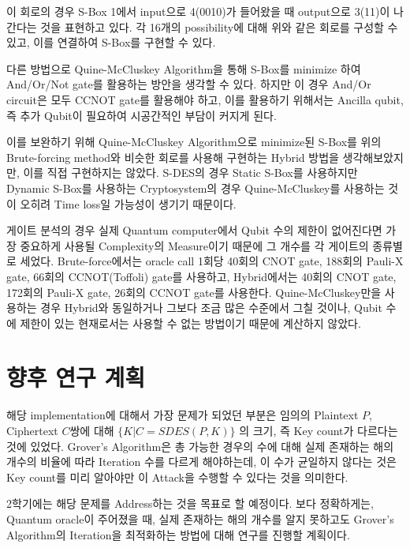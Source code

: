 \documentclass{article}
\theoremstyle{break}
\begin{document}
	이 회로의 경우 S-Box 1에서 input으로 4(0010)가 들어왔을 때 output으로 3(11)이 나간다는 것을 표현하고 있다. 각 16개의 possibility에 대해 위와 같은 회로를 구성할 수 있고, 이를 연결하여 S-Box를 구현할 수 있다.
	
	다른 방법으로 Quine-McCluskey Algorithm을 통해 S-Box를 minimize 하여 And/Or/Not gate를 활용하는 방안을 생각할 수 있다. 하지만 이 경우 And/Or circuit은 모두 CCNOT gate를 활용해야 하고, 이를 활용하기 위해서는 Ancilla qubit, 즉 추가 Qubit이 필요하여 시공간적인 부담이 커지게 된다.
	
	이를 보완하기 위해 Quine-McCluskey Algorithm으로 minimize된 S-Box를 위의 Brute-forcing method와 비슷한 회로를 사용해 구현하는 Hybrid 방법을 생각해보았지만, 이를 직접 구현하지는 않았다. S-DES의 경우 Static S-Box를 사용하지만 Dynamic S-Box를 사용하는 Cryptosystem의 경우 Quine-McCluskey를 사용하는 것이 오히려 Time loss일 가능성이 생기기 때문이다.
	
	게이트 분석의 경우 실제 Quantum computer에서 Qubit 수의 제한이 없어진다면 가장 중요하게 사용될 Complexity의 Measure이기 때문에 그 개수를 각 게이트의 종류별로 세었다. Brute-force에서는 oracle call 1회당 40회의 CNOT gate, 188회의 Pauli-X gate, 66회의 CCNOT(Toffoli) gate를 사용하고, Hybrid에서는 40회의 CNOT gate, 172회의 Pauli-X gate, 26회의 CCNOT gate를 사용한다. Quine-McCluskey만을 사용하는 경우 Hybrid와 동일하거나 그보다 조금 많은 수준에서 그칠 것이나, Qubit 수에 제한이 있는 현재로서는 사용할 수 없는 방법이기 때문에 계산하지 않았다.
	
	\section{향후 연구 계획}
	
	해당 implementation에 대해서 가장 문제가 되었던 부분은 임의의 Plaintext $P$, Ciphertext $C$쌍에 대해 $\{K|C=SDES(P,K)\}$ 의 크기, 즉 Key count가 다르다는 것에 있었다. Grover's Algorithm은 총 가능한 경우의 수에 대해 실제 존재하는 해의 개수의 비율에 따라 Iteration 수를 다르게 해야하는데, 이 수가 균일하지 않다는 것은 Key count를 미리 알아야만 이 Attack을 수행할 수 있다는 것을 의미한다.
	
	2학기에는 해당 문제를 Address하는 것을 목표로 할 예정이다. 보다 정확하게는, Quantum oracle이 주어졌을 때, 실제 존재하는 해의 개수를 알지 못하고도 Grover's Algorithm의 Iteration을 최적화하는 방법에 대해 연구를 진행할 계획이다.
	
\end{document}
